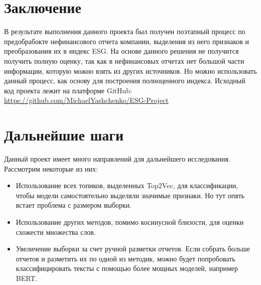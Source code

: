 \documentclass[a4paper, 14pt]{extarticle}
\begin{document}
\section{Заключение}

В результате выполнения данного проекта был получен поэтапный процесс по предобрабокте нефинансового отчета компании, выделения из него признаков и преобразования их в индекс ESG. На основе данного решения не получится получить полную оценку, так как в нефинансовых отчетах нет большой части информации, которую можно взять из других источников. Но можно использовать данный процесс, как основу для построения полноценного индекса.
\newline
Исходный код проекта лежит на платформе GitHub:
\newline
\href{https://github.com/MichaelYashchenko/ESG-Project}{https://github.com/MichaelYashchenko/ESG-Project}

\section{Дальнейшие шаги}

Данный проект имеет много направлений для дальнейшего исследования. Рассмотрим некоторые из них:
\begin{itemize}
    \item Использование всех топиков, выделенных Top2Vec, для классификации, чтобы модели самостоятельно выделяли значимые признаки. Но тут опять встает проблема с размером выборки.
    \item Использование других методов, помимо косинусной близости, для оценки схожести множества слов.
    \item Увеличение выборки за счет ручной разметки отчетов. Если собрать больше отчетов и разметить их по одной из методик, можно будет попробовать классифицировать тексты с помощью более мощных моделей, например BERT.
\end{itemize}

\newpage
 
 
\end{document}
